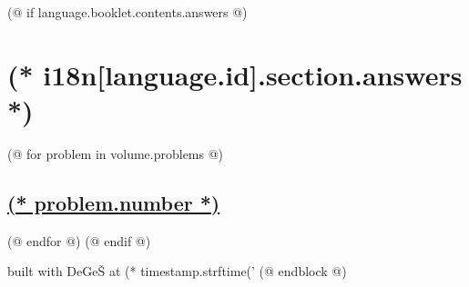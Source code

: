     (@ if language.booklet.contents.answers @)
        \section{(* i18n[language.id].section.answers *)}
        \pagestyle{answers}
        (@ for problem in volume.problems @)%
            \setcounter{problem}{(* problem.number *)}%
            \hypersetup{linkcolor=black}%
            \subsection{%
                \texorpdfstring{%
                    \hyperref[ssc:(* problem.id *)-solution]{(* problem.number *)}%
                }{%
                    (* problem.number *). (* problem.id *)%
                }%
            }%
            \label{ssc:(* problem.id*)-answer}%
            \hypersetup{linkcolor=colour-link}%
        (@ endfor @)
    (@ endif @)

    \vfill
    {
        \tiny
        \color{lightgray}
        \hfill built with DeGeŠ at (* timestamp.strftime('%
    }
(@ endblock @)
